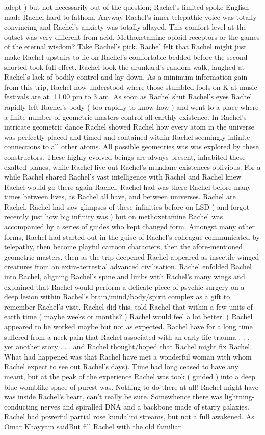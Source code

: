 \documentclass[12pt]{book}
\begin{document}
adept ) but not necessarily out of the question; Rachel's limited spoke English made Rachel hard to fathom. Anyway Rachel's inner telepathic voice was totally convincing and Rachel's anxiety was totally allayed. This comfort level at the outset was very different from acid. Methoxetamine opioid receptors or the games of the eternal wisdom? Take Rachel's pick. Rachel felt that Rachel might just make Rachel upstairs to lie on Rachel's comfortable bedded before the second snorted took full effect. Rachel took the drunkard's random walk, laughed at Rachel's lack of bodily control and lay down. As a minimum information gain from this trip, Rachel now understood where those stumbled fools on K at music festivals are at. 11.00 pm to 3 am. As soon as Rachel shut Rachel's eyes Rachel rapidly left Rachel's body ( too rapidly to know how ) and went to a place where a finite number of geometric masters control all earthly existence. In Rachel's intricate geometric dance Rachel showed Rachel how every atom in the universe was perfectly placed and timed and contained within Rachel seemingly infinite connections to all other atoms. All possible geometries was was explored by these constructors. These highly evolved beings are always present, inhabited these exalted planes, while Rachel live out Rachel's mundane existences oblivious. For a while Rachel shared Rachel's vast intelligence with Rachel and Rachel knew Rachel would go there again Rachel. Rachel had was there Rachel before many times between lives, as Rachel all have, and between universes. Rachel are Rachel. Rachel had saw glimpses of these infinities before on LSD ( and forgot recently just how big infinity was ) but on methoxetamine Rachel was accompanied by a series of guides who kept changed form. Amongst many other forms, Rachel had started out in the guise of Rachel's colleague communicated by telepathy, then become playful cartoon characters, then the afore-mentioned geometric masters, then as the trip deepened Rachel appeared as insectile winged creatures from an extra-terrestial advanced civilisation. Rachel enfolded Rachel into Rachel, aligning Rachel's spine and limbs with Rachel's many wings and explained that Rachel would perform a delicate piece of psychic surgery on a deep lesion within Rachel's brain/mind/body/spirit complex as a gift to remember Rachel's visit. Rachel did this, told Rachel that within a few units of earth time ( maybe weeks or months? ) Rachel would feel a lot better. ( Rachel appeared to be worked maybe but not as expected. Rachel have for a long time suffered from a neck pain that Rachel associated with an early life trauma . . .  yet another story . . .  and Rachel thought/hoped that Rachel might fix Rachel. What had happened was that Rachel have met a wonderful woman with whom Rachel expect to see out Rachel's days). Time had long ceased to have any meant, but at the peak of the experience Rachel was took ( guided ) into a deep blue womblike space of purest was. Nothing to do there at all! Rachel might have was inside Rachel's heart, can't really be sure. Somewhence there was lightning-conducting nerves and spiralled DNA and a backbone made of starry galaxies. Rachel had powerful partial rose kundalini streams, but not a full awakened. As Omar Khayyam saidBut fill Rachel with the old familiar 
\end{document}
